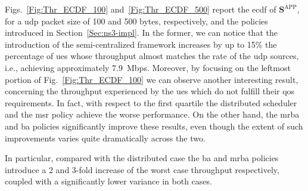 Figs.~\ref{Fig:Thr_ECDF_100} and~\ref{Fig:Thr_ECDF_500} report the \gls{ecdf} of $\mathbf{S}^{\mathrm{APP}}$, for a \gls{udp} packet size of 100 and 500 bytes, respectively, and the policies introduced in Section~\ref{Sec:ns3-impl}. In the former, we can notice that the introduction of the semi-centralized framework increases by up to 15\% the percentage of \glspl{ue} whose throughput almost matches the rate of the \gls{udp} sources, i.e., achieving approximately 7.9~Mbps.
Moreover, by focusing on the leftmost portion of Fig.~\ref{Fig:Thr_ECDF_100} we can observe another interesting result, concerning the throughput experienced by the \glspl{ue} which do not fulfill their \gls{qos} requirements. In fact, with respect to the first quartile the distributed scheduler and the \gls{msr} policy achieve the worse performance.
On the other hand, the \gls{mrba} and \gls{ba} policies significantly improve these results, even though the extent of such improvements varies quite dramatically across the two.

In particular, compared with the distributed case the \gls{ba} and \gls{mrba} policies introduce a 2 and 3-fold increase of the worst case throughput respectively, coupled with a significantly lower variance in both cases. 

